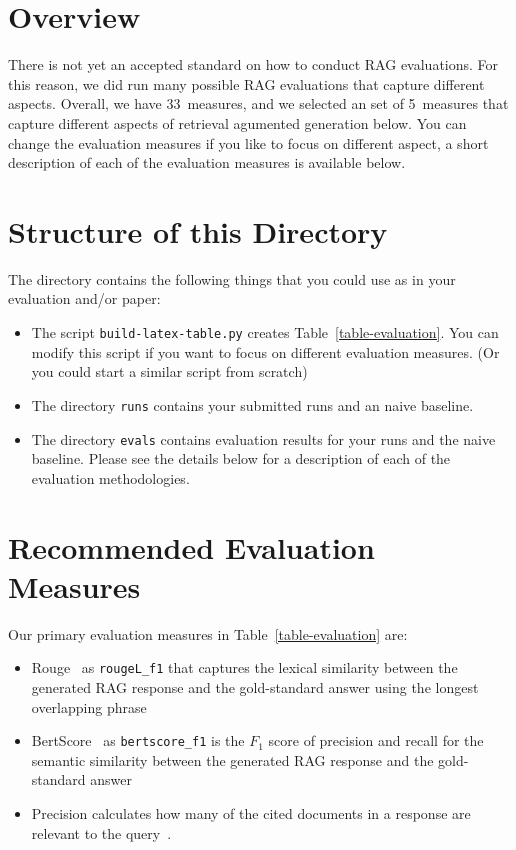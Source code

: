 \documentclass[]{ceurart}
\begin{document}
\section{Overview}

There is not yet an accepted standard on how to conduct RAG evaluations. For this reason, we did run many possible RAG evaluations that capture different aspects. Overall, we have 33~measures, and we selected an set of 5~measures that capture different aspects of retrieval agumented generation below. You can change the evaluation measures if you like to focus on different aspect, a short description of each of the evaluation measures is available below.

\section{Structure of this Directory}
The directory contains the following things that you could use as in your evaluation and/or paper:
\begin{itemize}
\item
The script \texttt{\small build-latex-table.py} creates Table~\ref{table-evaluation}. You can modify this script if you want to focus on different evaluation measures. (Or you could start a similar script from scratch)
\item
The directory \texttt{\small runs} contains your submitted runs and an naive baseline.
\item
The directory \texttt{\small evals} contains evaluation results for your runs and the naive baseline. Please see the details below for a description of each of the evaluation methodologies.
\end{itemize}




\section{Recommended Evaluation Measures}

Our primary evaluation measures in Table~\ref{table-evaluation} are:

\begin{itemize}
\item
Rouge~\cite{lin:2004} as \texttt{rougeL\_f1} that captures the lexical similarity between the generated RAG response and the gold-standard answer using the longest overlapping phrase

\item
BertScore~\cite{zhang:2020} as \texttt{bertscore\_f1} is the $F_{1}$ score of precision and recall for the semantic similarity between the generated RAG response and the gold-standard answer

\item
Precision calculates how many of the cited documents in a response are relevant to the query~\cite{dietz:2026,farzi:2026}.

\end{itemize}
\end{document}
